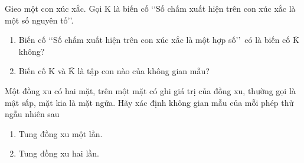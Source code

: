 \begin{vd}%
	Gieo một con xúc xắc. Gọi $ \mathrm{K} $ là biến cố \lq\lq  Số chấm xuất hiện trên con xúc xắc là một số nguyên tố\rq\rq.
	\begin{enumerate}
		\item Biến cố \lq\lq  Số chấm xuất hiện trên con xúc xắc là một hợp số\rq\rq\, có là biến cố $\mathrm{\overline{K}}$ không?
		\item Biến cố $ \mathrm{K} $ và $\mathrm{\overline{K}}$ là tập con nào của không gian mẫu?
	\end{enumerate}
\end{vd}
\begin{vd}%
	Một đồng xu có hai mặt, trên một mặt có ghi giá trị của đồng xu, thường gọi là mật sấp, mặt kia là mặt ngửa. Hãy xác định không gian mẫu của mỗi phép thử ngẫu nhiên sau
	\begin{enumerate}
		\item Tung đồng xu một lần.
		\item Tung đồng xu hai lần.
	\end{enumerate}
\end{vd}

